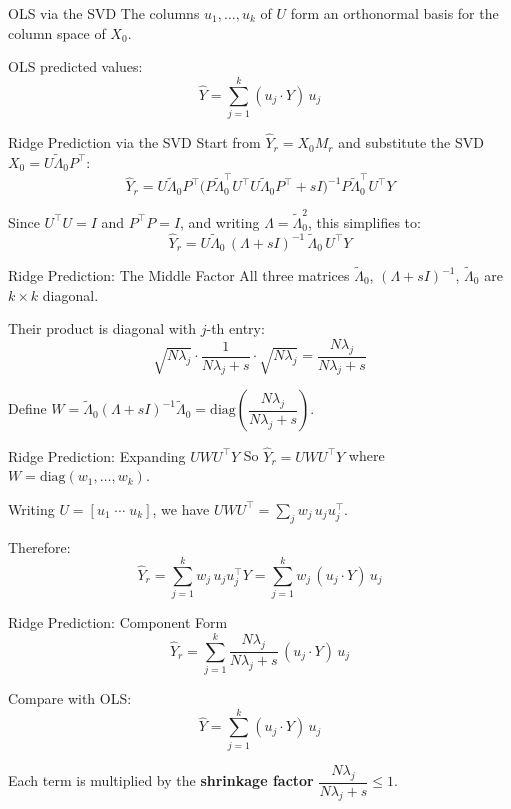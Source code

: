 \documentclass{beamer}
\begin{document}
\begin{frame}{OLS via the SVD}
The columns $u_1,\ldots,u_k$ of $U$ form an orthonormal basis for the column space of $X_0$.

\bigskip
OLS predicted values:
\[
  \hat{Y} = \sum_{j=1}^{k} (u_j \cdot Y)\, u_j
\]
\end{frame}

\begin{frame}{Ridge Prediction via the SVD}
Start from $\hat{Y}_r = X_0 M_r$ and substitute the SVD $X_0 = U\tilde{\Lambda}_0 P^\intercal$:
\[
  \hat{Y}_r = U\tilde{\Lambda}_0 P^\intercal \bigl(P\tilde{\Lambda}_0^\intercal U^\intercal U \tilde{\Lambda}_0 P^\intercal + sI\bigr)^{-1} P\tilde{\Lambda}_0^\intercal U^\intercal Y
\]

\bigskip
Since $U^\intercal U = I$ and $P^\intercal P = I$, and writing $\Lambda = \tilde{\Lambda}_0^2$, this simplifies to:
\[
  \hat{Y}_r = U\tilde{\Lambda}_0\,(\Lambda + sI)^{-1}\,\tilde{\Lambda}_0\, U^\intercal Y
\]
\end{frame}

\begin{frame}{Ridge Prediction: The Middle Factor}
All three matrices $\tilde{\Lambda}_0$, $(\Lambda+sI)^{-1}$, $\tilde{\Lambda}_0$ are $k\times k$ diagonal.

\bigskip
Their product is diagonal with $j$-th entry:
\[
  \sqrt{N\lambda_j} \cdot \frac{1}{N\lambda_j + s} \cdot \sqrt{N\lambda_j}
  = \frac{N\lambda_j}{N\lambda_j + s}
\]

\bigskip
Define $W = \tilde{\Lambda}_0(\Lambda+sI)^{-1}\tilde{\Lambda}_0 = \mathrm{diag}\!\left(\dfrac{N\lambda_j}{N\lambda_j+s}\right)$.
\end{frame}

\begin{frame}{Ridge Prediction: Expanding $UWU^\intercal Y$}
So $\hat{Y}_r = UWU^\intercal Y$ where $W = \mathrm{diag}(w_1,\ldots,w_k)$.

\bigskip
Writing $U = [u_1 \;\cdots\; u_k]$, we have $UWU^\intercal = \sum_j w_j\, u_j u_j^\intercal$.

\bigskip
Therefore:
\[
  \hat{Y}_r = \sum_{j=1}^k w_j\, u_j u_j^\intercal Y = \sum_{j=1}^k w_j\,(u_j\cdot Y)\,u_j
\]
\end{frame}

\begin{frame}{Ridge Prediction: Component Form}
\[
  \hat{Y}_r = \sum_{j=1}^{k} \frac{N\lambda_j}{N\lambda_j + s}\,(u_j \cdot Y)\, u_j
\]

\bigskip
Compare with OLS:
\[
  \hat{Y} = \sum_{j=1}^{k} (u_j \cdot Y)\, u_j
\]

\bigskip
Each term is multiplied by the \textbf{shrinkage factor} $\dfrac{N\lambda_j}{N\lambda_j+s} \leq 1$.
\end{frame}
\end{document}
